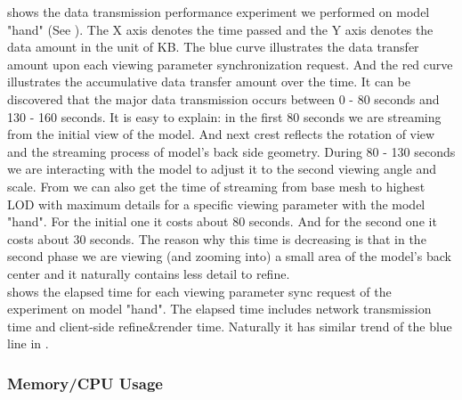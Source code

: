  shows the data transmission performance experiment we performed on model "hand" (See ). The X axis denotes the time passed and the Y axis denotes the data amount in the unit of KB. The blue curve illustrates the data transfer amount upon each viewing parameter synchronization request. And the red curve illustrates the accumulative data transfer amount over the time. It can be discovered that the major data transmission occurs between 0 - 80 seconds and 130 - 160 seconds. It is easy to explain: in the first 80 seconds we are streaming from the initial view of the model. And next crest reflects the rotation of view and the streaming process of model's back side geometry. During 80 - 130 seconds we are interacting with the model to adjust it to the second viewing angle and scale. From  we can also get the time of streaming from base mesh to highest LOD with maximum details for a specific viewing parameter with the model "hand". For the initial one it costs about 80 seconds. And for the second one it costs about 30 seconds. The reason why this time is decreasing is that in the second phase we are viewing (and zooming into) a small area of the model's back center and it naturally contains less detail to refine. \\

 shows the elapsed time for each viewing parameter sync request of the experiment on model "hand". The elapsed time includes network transmission time and client-side refine\&render time. Naturally it has similar trend of the blue line in .







\subsubsection{Memory/CPU Usage}
\label{section:clientmemcpuusage}

